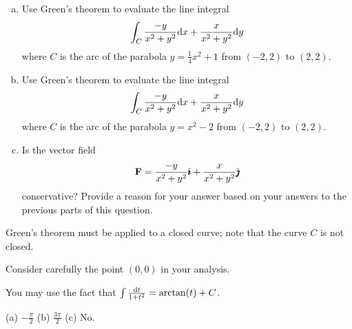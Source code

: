 \begin{question}[M317 2015A]  %
\begin{enumerate}[(a)]
\item
Use Green's theorem to evaluate the line integral
\begin{equation*}
\int_C \frac{-y}{x^2+y^2}\mathrm{d}x + \frac{x}{x^2+y^2}\mathrm{d}y
\end{equation*}
where $C$ is the arc of the parabola $y = \frac{1}{4}x^2 + 1$ from 
$(-2, 2)$ to $(2, 2)$. 


\item
Use Green's theorem to evaluate the line integral
\begin{equation*}
\int_C \frac{-y}{x^2+y^2}\mathrm{d}x + \frac{x}{x^2+y^2}\mathrm{d}y
\end{equation*}
where $C$ is the arc of the parabola $y = x^2 -2$ from 
$(-2, 2)$ to $(2, 2)$.


\item
Is the vector field
\begin{equation*}
\mathbf{F}=\frac{-y}{x^2+y^2}\hat{\pmb{\imath}} + \frac{x}{x^2+y^2}\hat{\pmb{\jmath}}
\end{equation*}
conservative? Provide a reason for your answer based on your answers 
to the previous parts of this question.
\end{enumerate}

\end{question}

\begin{hint} 
Green's theorem must be applied to a closed curve; note that the 
curve $C$ is not closed. 

Consider carefully the point $(0, 0)$ in your analysis. 

You may use the fact that
$\int \frac{\mathrm{d}t}{1+t^2} = \arctan(t) + C$.
\end{hint}

\begin{answer} 
(a) $-\frac{\pi}{2}$\qquad
(b) $\frac{3\pi}{2}$\qquad
(c) No.
\end{answer}

